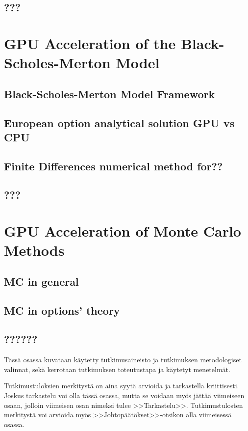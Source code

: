 \documentclass[english,12pt,a4paper,pdftex,sci,utf8]{aaltothesis}
\begin{document}
\subsection{???}

\section{GPU Acceleration of the Black-Scholes-Merton Model} \label{sec:gpu-bsm}
\subsection{Black-Scholes-Merton Model Framework}
\subsection{European option analytical solution GPU vs CPU}
\subsection{Finite Differences numerical method for??}
\subsection{???}

\section{GPU Acceleration of Monte Carlo Methods} \label{sec:gpu-mc}
\subsection{MC in general}
\subsection{MC in options' theory}
\subsection{??????}

T\"ass\"a osassa kuvataan k\"aytetty tutkimusaineisto ja
tutkimuksen metodologiset valinnat, sek\"a
kerrotaan tutkimuksen toteutustapa ja k\"aytetyt menetelm\"at. 

\clearpage


Tutkimustuloksien merkityst\"a on aina syyt\"a arvioida ja tarkastella
kriittisesti.  Joskus tarkastelu voi olla t\"ass\"a osassa, mutta se
voidaan my\"os j\"att\"a\"a viimeiseen osaan, jolloin viimeisen osan nimeksi
tulee >>Tarkastelu>>. Tutkimustulosten merkityst\"a voi arvioida my\"os
>>Johtop\"a\"at\"okset>>-otsikon alla viimeisess\"a osassa. 
\end{document}
